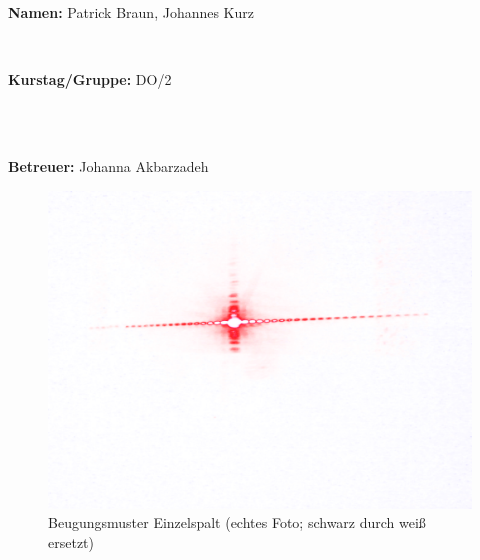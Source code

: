 \documentclass[12pt,a4paper]{article}
\begin{document}
\begin{verbatim}
\end{verbatim}
		\begin{flushleft}
			\textbf{\Large{Namen:}} \Large{Patrick Braun, Johannes Kurz}
			\end{flushleft}

\begin{verbatim}


\end{verbatim}
			\begin{flushleft}
			\textbf{\Large{Kurstag/Gruppe:}} \Large{DO/2}
			\end{flushleft}

\begin{verbatim}



\end{verbatim}
			\begin{flushleft}
			\LARGE{\textbf{Betreuer:}}	\Large{ Johanna Akbarzadeh }	
			\end{flushleft}

\pagebreak
\setlength{\columnsep}{20pt}
\begin{multicols}{2}

\end{multicols}
\begin{figure}[H]
	\centering
	\includegraphics[scale=0.35]{./figure/beugung.png}
	\caption{Beugungsmuster Einzelspalt (echtes Foto; schwarz durch weiß ersetzt)}
	\label{fig:beugungsmuster}
\end{figure}
\end{document}
